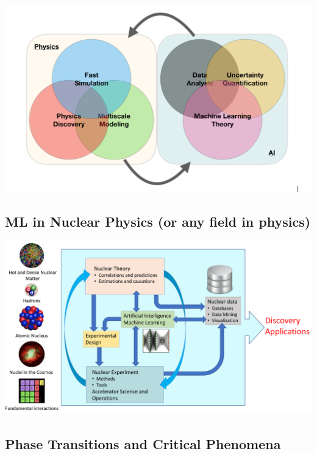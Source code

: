 \documentclass[%
oneside,                 %
final,                   %
10pt]{article}
\begin{document}
\centerline{\includegraphics[width=1.0\linewidth]{figures/mlimage.png}}

\vspace{6mm}

\subsection{ML in Nuclear  Physics (or any field in physics)}

\vspace{6mm}

\centerline{\includegraphics[width=1.0\linewidth]{figures/ML-NP.pdf}}

\vspace{6mm}

\subsection{Phase Transitions and Critical Phenomena}
\end{document}
